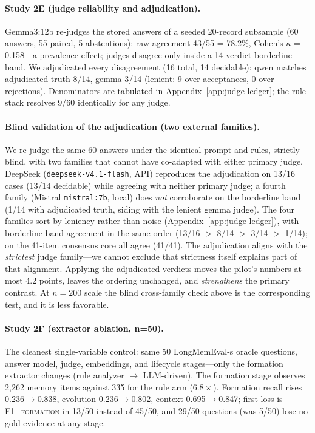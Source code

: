 \documentclass[11pt]{article}
\newcommand{\fone}{F1\textsc{\_formation}}
\begin{document}
\paragraph{Study 2E (judge reliability and adjudication).}
Gemma3:12b re-judges the stored answers of a seeded 20-record subsample
(60 answers, 55 paired, 5 abstentions): raw agreement 43/55 = 78.2\%,
Cohen's $\kappa$ = 0.158---a prevalence effect; judges disagree only
inside a 14-verdict borderline band. We adjudicated every disagreement
(16 total, 14 decidable): qwen matches adjudicated truth 8/14, gemma
3/14 (lenient: 9 over-acceptances, 0 over-rejections). Denominators are
tabulated in Appendix~\ref{app:judge-ledger}; the rule stack resolves
9/60 identically for any judge.

\paragraph{Blind validation of the adjudication (two external families).}
We re-judge the same 60 answers under the identical prompt and rules,
strictly blind, with two families that cannot have co-adapted with
either primary judge. DeepSeek (\texttt{deepseek-v4.1-flash}, API)
reproduces the adjudication on 13/16 cases (13/14 decidable) while
agreeing with neither primary judge; a fourth family (Mistral
\texttt{mistral:7b}, local) does \emph{not} corroborate on the
borderline band (1/14 with adjudicated truth, siding with the lenient
gemma judge). The four families sort by leniency rather than noise
(Appendix~\ref{app:judge-ledger}), with borderline-band agreement in the
same order (13/16 $>$ 8/14 $>$ 3/14 $>$ 1/14); on the 41-item consensus
core all agree (41/41). The adjudication aligns with the \emph{strictest}
judge family---we cannot exclude that strictness itself explains part of
that alignment. Applying the adjudicated verdicts moves the pilot's
numbers at most 4.2 points, leaves the ordering unchanged, and
\emph{strengthens} the primary contrast. At $n{=}200$ scale the blind
cross-family check above is the corresponding test, and it is less
favorable.
\paragraph{Study 2F (extractor ablation, n=50).}
The cleanest single-variable control: same 50 LongMemEval-s oracle
questions, answer model, judge, embeddings, and lifecycle stages---only
the formation extractor changes (rule analyzer $\to$ LLM-driven). The
formation stage observes 2{,}262 memory items against 335 for the rule
arm ($6.8\times$). Formation recall rises 0.236$\to$0.838, evolution
0.236$\to$0.802, context 0.695$\to$0.847; first loss is \fone{} in 13/50
instead of 45/50, and 29/50 questions (was 5/50) lose no gold evidence at
any stage.
\end{document}
